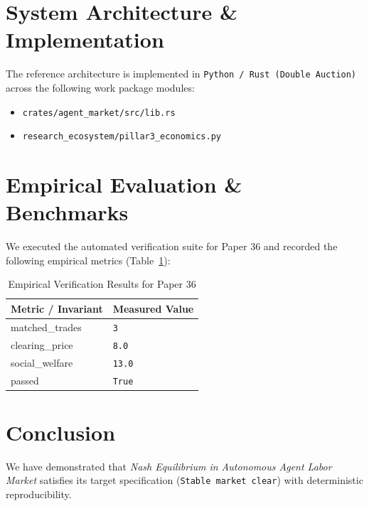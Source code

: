 \documentclass[10pt,twocolumn]{article}
\begin{document}
\section{System Architecture \& Implementation}
The reference architecture is implemented in \texttt{Python / Rust (Double Auction)} across the following work package modules:
\begin{itemize}
  \item \texttt{crates/agent\_market/src/lib.rs}
  \item \texttt{research\_ecosystem/pillar3\_economics.py}
\end{itemize}

\section{Empirical Evaluation \& Benchmarks}
We executed the automated verification suite for Paper 36 and recorded the following empirical metrics (Table~\ref{tab:metrics}):

\begin{table}[htbp]
\centering
\caption{Empirical Verification Results for Paper 36}
\label{tab:metrics}
\begin{tabular}{ll}
\toprule
\textbf{Metric / Invariant} & \textbf{Measured Value} \\
\midrule
    matched\_trades & \texttt{3} \\
    clearing\_price & \texttt{8.0} \\
    social\_welfare & \texttt{13.0} \\
    passed & \texttt{True} \\
\bottomrule
\end{tabular}
\end{table}

\section{Conclusion}
We have demonstrated that \textit{Nash Equilibrium in Autonomous Agent Labor Market} satisfies its target specification (\texttt{Stable market clear}) with deterministic reproducibility.



\end{document}
